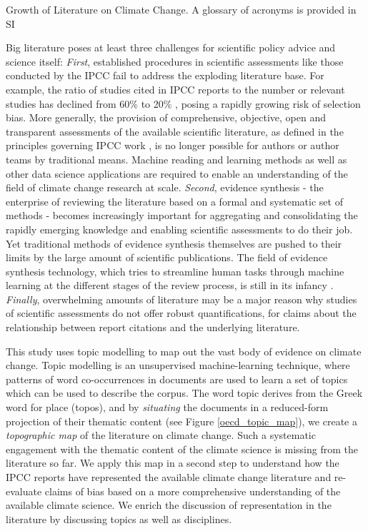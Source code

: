 \documentclass{article}
\begin{document}
\begin{linenumbers}
		
		\begin{table}[htp]
			\begin{center}
				{\scriptsize
					}
				\caption{Growth of Literature on Climate Change. A glossary of acronyms is provided in SI}
				\label{tab}
			\end{center}
		\end{table}
		
		Big literature poses at least three challenges for scientific policy advice and science itself: \emph{First}, established procedures in scientific assessments like those conducted by the IPCC fail to address the exploding literature base. For example, the ratio of studies cited in IPCC reports to the number or relevant studies has declined from 60\% to 20\%  \cite{Minx2017l}, posing a rapidly growing risk of selection bias. More generally, the provision of comprehensive, objective, open and transparent assessments of the available scientific literature, as defined in the principles governing IPCC work \cite{IPCC2013}, is no longer possible for authors or author teams by traditional means. 
		Machine reading and learning methods as well as other data science applications are required to enable an understanding of the field of climate change research at scale. 
		\emph{Second}, evidence synthesis - the enterprise of reviewing the literature based on a formal and systematic set of methods \cite{Chalmers2002} - becomes increasingly important for aggregating and consolidating the rapidly emerging knowledge and enabling scientific assessments to do their job. 
		Yet traditional methods of evidence synthesis themselves are pushed to their limits by the large amount of scientific publications. The field of evidence synthesis technology, which tries to streamline human tasks through machine learning at the different stages of the review process, is still in its infancy \cite{Beller2018}. \emph{Finally}, overwhelming amounts of literature may be a major reason why studies of scientific assessments \cite{Bjurström2011, Hulme2010, Victor2015} do not offer robust quantifications, for claims about the relationship between report citations and the underlying literature. 
		
		This study uses topic modelling \cite{Blei2010} to map out the vast body of evidence on climate change. Topic modelling is an unsupervised machine-learning technique, where patterns of word co-occurrences in documents are used to learn a set of topics which can be used to describe the corpus. The word topic derives from the Greek word for place (topos), and by \textit{situating} the documents in a reduced-form projection of their thematic content (see Figure \ref{oecd_topic_map}), we create a \textit{topographic map} of the literature on climate change. Such a systematic engagement with the thematic content of the climate science is missing from the literature so far. 
		We apply this map in a second step to understand how the IPCC reports have represented the available climate change literature and re-evaluate claims of bias based on a more comprehensive understanding of the available climate science. We enrich the discussion of representation in the literature by discussing topics as well as disciplines. 
		

\end{linenumbers}
\end{document}
